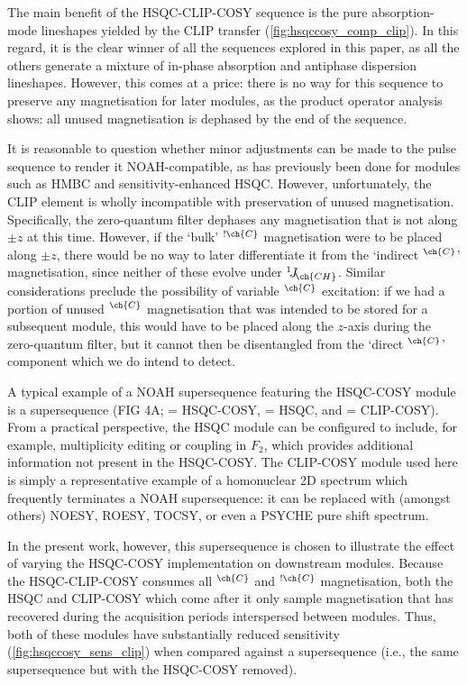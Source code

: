 \documentclass[a4paper,12pt]{article}
\newcommand{\magn}[1]{\ch{^1H}$^{\ch{#1}}$}
\newcommand{\magnnot}[1]{\ch{^1H}$^{!\ch{#1}}$}
\newcommand{\todo}[1]{{\color{OrangeRed}#1}}
\newcommand{\oneJ}[1]{{}^{1}\!J_{\!\ch{#1}}}
\begin{document}
\begin{refsection}
The main benefit of the HSQC-CLIP-COSY sequence is the pure absorption-mode lineshapes yielded by the CLIP transfer (\cref{fig:hsqccosy_comp_clip}).
In this regard, it is the clear winner of all the sequences explored in this paper, as all the others generate a mixture of in-phase absorption and antiphase dispersion lineshapes.
However, this comes at a price: there is no way for this sequence to preserve any magnetisation for later modules, as the product operator analysis shows: all unused magnetisation is dephased by the end of the sequence.

It is reasonable to question whether minor adjustments can be made to the pulse sequence to render it NOAH-compatible, as has previously been done for modules such as HMBC\autocite{Claridge2019MRC,Kupce2019JMR} and sensitivity-enhanced HSQC\autocite{Hansen2021AC,Yong2021JMR}.
However, unfortunately, the CLIP element is wholly incompatible with preservation of unused magnetisation.
Specifically, the zero-quantum filter dephases any magnetisation that is not along $\pm z$ at this time.
However, if the `bulk' \magnnot{C} magnetisation were to be placed along $\pm z$, there would be no way to later differentiate it from the `indirect \magn{C}' magnetisation, since neither of these evolve under $\oneJ{CH}$.
Similar considerations preclude the possibility of variable \magn{C} excitation: if we had a portion of unused \magn{C} magnetisation that was intended to be stored for a subsequent module, this would have to be placed along the $z$-axis during the zero-quantum filter, but it cannot then be disentangled from the `direct \magn{C}' component which we do intend to detect.

A typical example of a NOAH supersequence featuring the HSQC-COSY module is a  supersequence (\todo{FIG 4A};  = HSQC-COSY,  = HSQC, and  = CLIP-COSY).
From a practical perspective, the HSQC module can be configured to include, for example, multiplicity editing or coupling in $F_2$, which provides additional information not present in the HSQC-COSY.
The CLIP-COSY module used here is simply a representative example of a homonuclear 2D spectrum which frequently terminates a NOAH supersequence: it can be replaced with (amongst others) NOESY, ROESY, TOCSY, or even a PSYCHE pure shift spectrum\autocite{Yong2022AC}.

In the present work, however, this supersequence is chosen to illustrate the effect of varying the HSQC-COSY implementation on downstream modules.
Because the HSQC-CLIP-COSY consumes all \magn{C} and \magnnot{C} magnetisation, both the HSQC and CLIP-COSY which come after it only sample magnetisation that has recovered during the acquisition periods interspersed between modules.
Thus, both of these modules have substantially reduced sensitivity (\cref{fig:hsqccosy_sens_clip}) when compared against a  supersequence (i.e., the same supersequence but with the HSQC-COSY removed).



\end{refsection}
\end{document}
